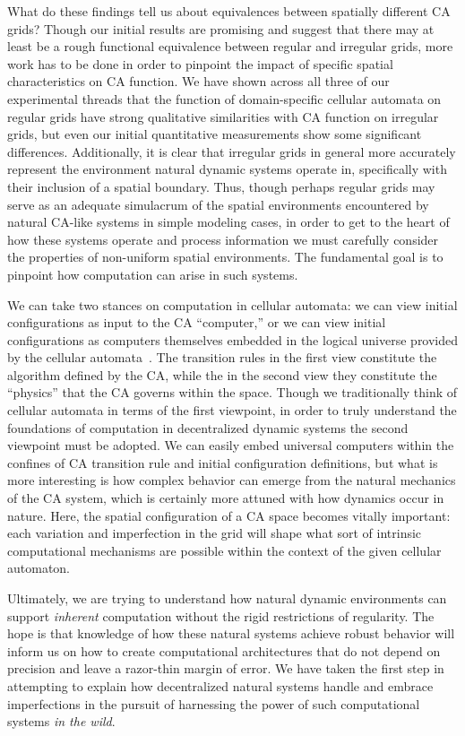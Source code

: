 \documentclass[a4paper,11pt]{article}
\begin{document}
What do these findings tell us about equivalences between spatially different CA grids? Though our initial results are promising and suggest that there may at least be a rough functional equivalence between regular and irregular grids, more work has to be done in order to pinpoint the impact of specific spatial characteristics on CA function. We have shown across all three of our experimental threads that the function of domain-specific cellular automata on regular grids have strong qualitative similarities with CA function on irregular grids, but even our initial quantitative measurements show some significant differences. Additionally, it is clear that irregular grids in general more accurately represent the environment natural dynamic systems operate in, specifically with their inclusion of a spatial boundary. Thus, though perhaps regular grids may serve as an adequate simulacrum of the spatial environments encountered by natural CA-like systems in simple modeling cases, in order to get to the heart of how these systems operate and process information we must carefully consider the properties of non-uniform spatial environments. The fundamental goal is to pinpoint how computation can arise in such systems.

We can take two stances on computation in cellular automata: we can view initial configurations as input to the CA ``computer,'' or we can view initial configurations as computers themselves embedded in the logical universe provided by the cellular automata~\cite{la90}. The transition rules in the first view constitute the algorithm defined by the CA, while the in the second view they constitute the ``physics'' that the CA governs within the space. Though we traditionally think of cellular automata in terms of the first viewpoint, in order to truly understand the foundations of computation in decentralized dynamic systems the second viewpoint must be adopted. We can easily embed universal computers within the confines of CA transition rule and initial configuration definitions, but what is more interesting is how complex behavior can emerge from the natural mechanics of the CA system, which is certainly more attuned with how dynamics occur in nature. Here, the spatial configuration of a CA space becomes vitally important: each variation and imperfection in the grid will shape what sort of intrinsic computational mechanisms are possible within the context of the given cellular automaton.

Ultimately, we are trying to understand how natural dynamic environments can support \textit{inherent} computation without the rigid restrictions of regularity. The hope is that knowledge of how these natural systems achieve robust behavior will inform us on how to create computational architectures that do not depend on precision and leave a razor-thin margin of error. We have taken the first step in attempting to explain how  decentralized natural systems handle and embrace imperfections in the pursuit of harnessing the power of such computational systems \textit{in the wild}.
\end{document}
